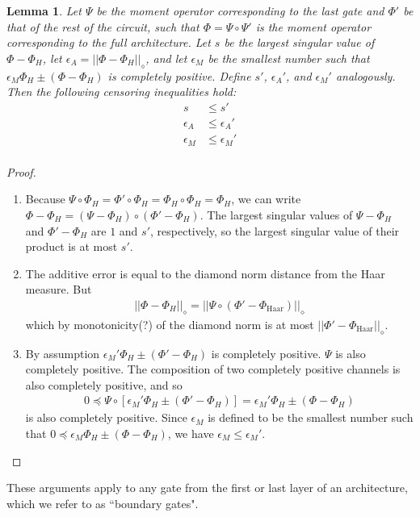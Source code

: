 \documentclass[aps,prx,floatfix,nofootinbib,superscriptaddress,longbibliography]{revtex4-2}
\newtheorem{lemma}{Lemma}
\begin{document}
\begin{appendices}
\begin{lemma}
Let \(\Psi\) be the moment operator corresponding to the last gate and \(\Phi'\) be that of the rest of the circuit, such that \(\Phi = \Psi \circ \Psi'\) is the moment operator corresponding to the full architecture. Let $s$ be the largest singular value of $\Phi - \Phi_H$, let $\epsilon_A = ||\Phi - \Phi_H||_\diamond$, and let $\epsilon_M$ be the smallest number such that \(\epsilon_M\Phi_H \pm (\Phi - \Phi_H)\) is completely positive. Define $s'$, $\epsilon_A'$, and $\epsilon_M'$ analogously. Then the following censoring inequalities hold:
\begin{align}
    s &\leq s' \\
    \epsilon_A &\leq \epsilon_A' \\
    \epsilon_M &\leq \epsilon_M' \\
\end{align}
\end{lemma}
\begin{proof}
\begin{enumerate}
    \item  Because $\Psi \circ \Phi_H = \Phi' \circ \Phi_H = \Phi_H \circ \Phi_H = \Phi_H$, we can write \(\Phi - \Phi_H = (\Psi - \Phi_H) \circ (\Phi' - \Phi_H)\). The largest singular values of $\Psi - \Phi_H$ and  $\Phi' - \Phi_H$ are $1$ and $s'$, respectively, so the largest singular value of their product is at most $s'$.
    \item The additive error is equal to the diamond norm distance from the Haar measure. But
    \begin{gather}
        ||\Phi - \Phi_H||_\diamond = ||\Psi \circ (\Phi' - \Phi_\text{Haar})||_\diamond 
    \end{gather}
    which by monotonicity(?) of the diamond norm is at most \(||\Phi' - \Phi_\text{Haar}||_\diamond\).
    \item By assumption \(\epsilon_M'\Phi_H \pm (\Phi' - \Phi_H)\) is completely positive. \(\Psi\) is also completely positive. The composition of two completely positive channels is also completely positive, and so 
\begin{gather}
    0 \preceq \Psi \circ \left[\epsilon_M'\Phi_H \pm (\Phi' - \Phi_H)\right] = \epsilon_M'\Phi_H \pm (\Phi - \Phi_H)
\end{gather}
is also completely positive. Since $\epsilon_M$ is defined to be the smallest number such that \(0 \preceq \epsilon_M\Phi_H \pm (\Phi - \Phi_H)\), we have $\epsilon_M \leq \epsilon_M'$.
\end{enumerate}
\end{proof}
These arguments apply to any gate from the first or last layer of an architecture, which we refer to as ``boundary gates".


\end{appendices}
\end{document}

